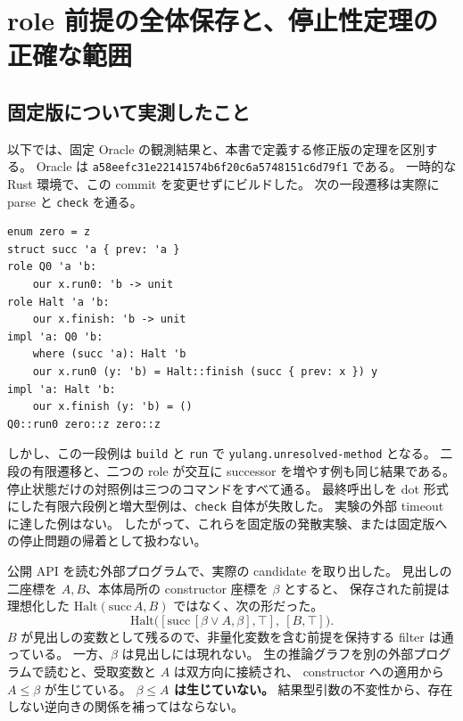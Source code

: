 \documentclass[11pt,a4paper]{article}
\theoremstyle{remark}
\begin{document}


\section{role 前提の全体保存と、停止性定理の正確な範囲}
\label{sec:role-termination}

\subsection{固定版について実測したこと}

以下では、固定 Oracle の観測結果と、本書で定義する修正版の定理を区別する。
Oracle は \texttt{a58eefc31e22141574b6f20c6a5748151c6d79f1} である。
一時的な Rust 環境で、この commit を変更せずにビルドした。
次の一段遷移は実際に parse と \texttt{check} を通る。

\begin{Verbatim}[fontsize=\small]
enum zero = z
struct succ 'a { prev: 'a }
role Q0 'a 'b:
    our x.run0: 'b -> unit
role Halt 'a 'b:
    our x.finish: 'b -> unit
impl 'a: Q0 'b:
    where (succ 'a): Halt 'b
    our x.run0 (y: 'b) = Halt::finish (succ { prev: x }) y
impl 'a: Halt 'b:
    our x.finish (y: 'b) = ()
Q0::run0 zero::z zero::z
\end{Verbatim}

しかし、この一段例は \texttt{build} と \texttt{run} で
\texttt{yulang.unresolved-method} となる。
二段の有限遷移と、二つの role が交互に successor を増やす例も同じ結果である。
停止状態だけの対照例は三つのコマンドをすべて通る。
最終呼出しを dot 形式にした有限六段例と増大型例は、\texttt{check} 自体が失敗した。
実験の外部 timeout に達した例はない。
したがって、これらを固定版の発散実験、または固定版への停止問題の帰着として扱わない。

公開 API を読む外部プログラムで、実際の candidate を取り出した。
見出しの二座標を $A,B$、本体局所の constructor 座標を $\beta$ とすると、
保存された前提は理想化した $\mathrm{Halt}(\mathrm{succ}\,A,B)$ ではなく、次の形だった。
\[
 \mathrm{Halt}\bigl(
   [\mathrm{succ}\,[\beta\lor A,\beta],\top],\ [B,\top]\bigr).
\]
$B$ が見出しの変数として残るので、非量化変数を含む前提を保持する filter は通っている。
一方、$\beta$ は見出しには現れない。
生の推論グラフを別の外部プログラムで読むと、受取変数と $A$ は双方向に接続され、
constructor への適用から $A\leq\beta$ が生じている。
\textbf{$\beta\leq A$ は生じていない。}
結果型引数の不変性から、存在しない逆向きの関係を補ってはならない。
\end{document}
